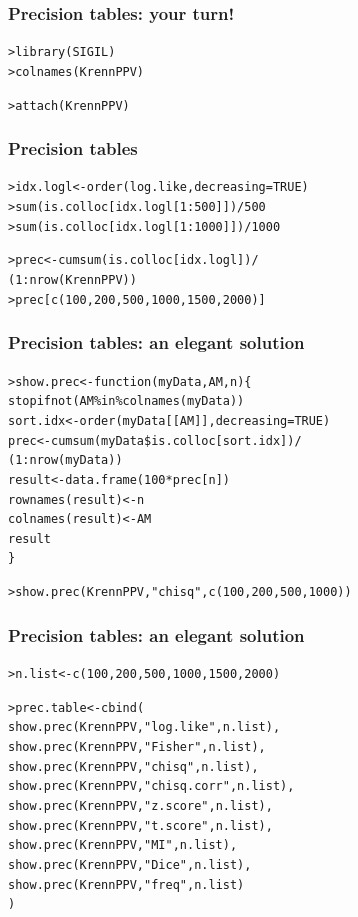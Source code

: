 \documentclass[t]{beamer} %
\begin{document}
\begin{frame}[fragile]
  \frametitle{Precision tables: your turn!}

  \begin{alltt}
> library(SIGIL)
> colnames(KrennPPV)

> attach(KrennPPV)

  \end{alltt}
\end{frame}

\begin{frame}[fragile]
  \frametitle{Precision tables}

  \begin{alltt}
> idx.logl <- order(log.like, decreasing=TRUE)
> sum(is.colloc[idx.logl[1:500]]) / 500   
> sum(is.colloc[idx.logl[1:1000]]) / 1000 

> prec <- cumsum(is.colloc[idx.logl]) / 
  (1:nrow(KrennPPV))
> prec[c(100,200,500,1000,1500,2000)]    
  \end{alltt}
\end{frame}

\begin{frame}[fragile]
  \frametitle{Precision tables: an elegant solution}

  \begin{alltt}
> show.prec <- function(myData, AM, n) \{
    stopifnot(AM \%in\% colnames(myData)) 
    sort.idx <- order(myData[[AM]], decreasing=TRUE)
    prec <- cumsum(myData\$is.colloc[sort.idx]) / 
            (1:nrow(myData))
    result <- data.frame(100 * prec[n]) 
    rownames(result) <- n  
    colnames(result) <- AM
    result  
  \}

> show.prec(KrennPPV, "chisq", c(100,200,500,1000))

  \end{alltt}
\end{frame}

\begin{frame}[fragile]
  \frametitle{Precision tables: an elegant solution}

  \begin{alltt}
> n.list <- c(100,200,500,1000,1500,2000)

> prec.table <- cbind(
    show.prec(KrennPPV, "log.like", n.list),
    show.prec(KrennPPV, "Fisher", n.list),
    show.prec(KrennPPV, "chisq", n.list),
    show.prec(KrennPPV, "chisq.corr", n.list),
    show.prec(KrennPPV, "z.score", n.list),
    show.prec(KrennPPV, "t.score", n.list),
    show.prec(KrennPPV, "MI", n.list),
    show.prec(KrennPPV, "Dice", n.list),
    show.prec(KrennPPV, "freq", n.list)
  )
  \end{alltt}
\end{frame}
\end{document}
